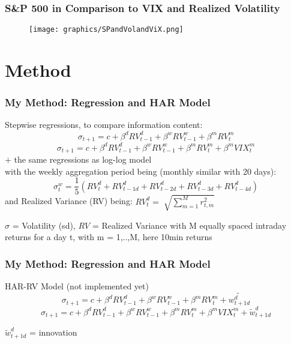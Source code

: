 \documentclass[aspectratio=169]{beamer}
\begin{document}
\begin{frame}
\frametitle{S\&P 500 in Comparison to VIX and Realized Volatility}
	\begin{figure}
	\centering
	\texttt{[image: graphics/SPandVolandViX.png]}
	\end{figure}
\end{frame}

\section{Method}


\begin{frame}
\frametitle{My Method: Regression and HAR Model}
%
Stepwise regressions, to compare information content:
	\begin{equation}
	\sigma_{t+1} = c + \beta^{d} RV^{d}_{t-1} + \beta^{w} RV^{w}_{t-1} + \beta^{m} RV^{m}_{t} 
	\end{equation}	
	\begin{equation}
	\sigma_{t+1} = c + \beta^{d} RV^{d}_{t-1} + \beta^{w} RV^{w}_{t-1} + \beta^{m} RV^{m}_{t} + \beta^{m} VIX^{m}_{t}
	\end{equation}
$+$ the same regressions as log-log model\\
with the weekly aggregation period being (monthly similar with 20 days):
	\begin{equation*}
	\sigma^{w}_{t} = \frac{1}{5} (RV^{d}_{t} + RV^{d}_{t-1d} + RV^{d}_{t-2d} + RV^{d}_{t-3d} + RV^{d}_{t-4d})
	\end{equation*}
and Realized Variance (RV) being: $	RV^{d}_{t} = \sqrt[]{\sum_{m=1}^{M} r^{2}_{t,m}} $\\
%
\begin{footnotesize}
$\sigma$ = Volatility (sd), $RV$ = Realized Variance with M equally spaced intraday returns for a day t, with m = 1,..,M, here 10min returns
\end{footnotesize}
%
\end{frame}

\begin{frame}
\frametitle{My Method: Regression and HAR Model}
HAR-RV Model (not implemented yet)
\begin{equation}
	\sigma_{t+1} = c + \beta^{d} RV^{d}_{t-1} + \beta^{w} RV^{w}_{t-1} + \beta^{m} RV^{m}_{t} + \tilde{w^{d}_{t+1d}}
	\end{equation}	
	\begin{equation}
	\sigma_{t+1} = c + \beta^{d} RV^{d}_{t-1} + \beta^{w} RV^{w}_{t-1} + \beta^{m} RV^{m}_{t} + \beta^{m} VIX^{m}_{t} + \tilde{w}^{d}_{t+1d}
	\end{equation}
\begin{footnotesize}
$\tilde{w}^{d}_{t+1d}$ = innovation
\end{footnotesize}

\end{frame}
\end{document}
